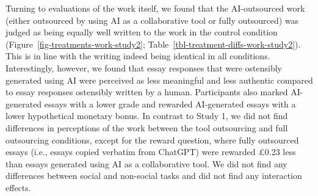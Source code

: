 \documentclass[
  man,
  floatsintext,
  longtable,
  nolmodern,
  notxfonts,
  notimes,
  colorlinks=true,linkcolor=blue,citecolor=blue,urlcolor=blue]{apa7}
\begin{document}
Turning to evaluations of the work itself, we found that the
AI-outsourced work (either outsourced by using AI as a collaborative
tool or fully outsourced) was judged as being equally well written to
the work in the control condition
(Figure~\ref{fig-treatments-work-study2};
Table~\ref{tbl-treatment-diffs-work-study2}). This is in line with the
writing indeed being identical in all conditions. Interestingly,
however, we found that essay responses that were ostensibly generated
using AI were perceived as less meaningful and less authentic compared
to essay responses ostensibly written by a human. Participants also
marked AI-generated essays with a lower grade and rewarded AI-generated
essays with a lower hypothetical monetary bonus. In contrast to Study 1,
we did not find differences in perceptions of the work between the tool
outsourcing and full outsourcing conditions, except for the reward
question, where fully outsourced essays (i.e., essays copied verbatim
from ChatGPT) were rewarded £0.23 less than essays generated using AI as
a collaborative tool. We did not find any differences between social and
non-social tasks and did not find any interaction effects.
\end{document}
